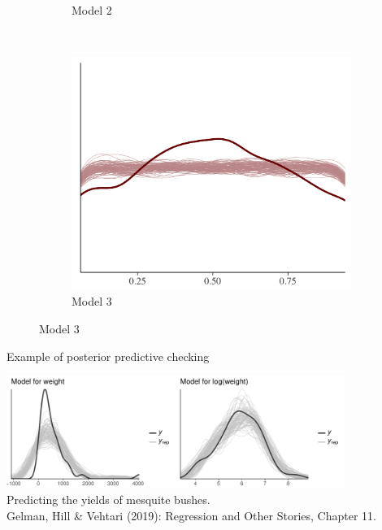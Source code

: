 \documentclass[t]{beamer}
\begin{document}
\begin{frame}
\begin{figure}
\begin{subfigure}{0.31\textwidth}
\caption{Model 2}
\end{subfigure}
~
\begin{subfigure}{0.31\textwidth}
\includegraphics[width=\textwidth]{ppc_loo_pit_overlay3.png}
\caption{Model 3}
\end{subfigure}

\end{figure}

\end{frame}

\begin{frame}[fragile]

  {\Large\color{navyblue} Example of posterior predictive checking}
  
    \includegraphics[width=11cm]{mesquite_ppc.pdf}\\
  \vspace{-0.1\baselineskip} {Predicting the yields of mesquite bushes.\\
    \color{gray} \footnotesize
    Gelman, Hill \& Vehtari (2019): Regression and Other Stories, Chapter 11.}\\

\end{frame}
\end{document}
